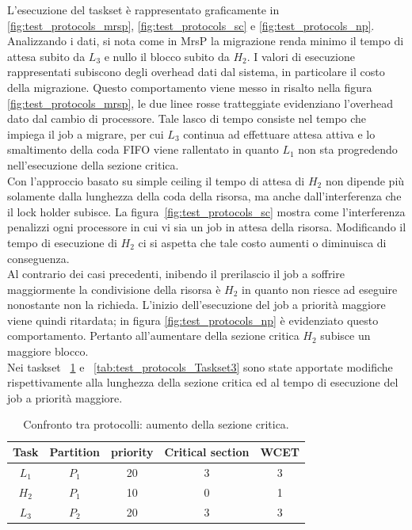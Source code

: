 \noindent L'esecuzione del taskset è rappresentato graficamente in \ref{fig:test_protocols_mrsp}, \ref{fig:test_protocols_sc} e \ref{fig:test_protocols_np}. Analizzando i dati, si nota come in MrsP la migrazione renda minimo il tempo di attesa subito da $L_3$ e nullo il blocco subito da $H_2$. I valori di esecuzione rappresentati subiscono degli overhead dati dal sistema, in particolare il costo della migrazione. Questo comportamento viene messo in risalto nella figura \ref{fig:test_protocols_mrsp}, le due linee rosse tratteggiate evidenziano l'overhead dato dal cambio di processore. Tale lasco di tempo consiste nel tempo che impiega il job a migrare, per cui $L_3$ continua ad effettuare attesa attiva e lo smaltimento della coda FIFO viene rallentato in quanto $L_1$ non sta progredendo nell'esecuzione della sezione critica.\\
Con l'approccio basato su simple ceiling il tempo di attesa di $H_2$ non dipende più solamente dalla lunghezza della coda della risorsa, ma anche dall'interferenza che il lock holder subisce. La figura~\ref{fig:test_protocols_sc} mostra come l'interferenza penalizzi ogni processore in cui vi sia un job in attesa della risorsa. Modificando il tempo di esecuzione di $H_2$ ci si aspetta che tale costo aumenti o diminuisca di conseguenza.\\
Al contrario dei casi precedenti, inibendo il prerilascio il job a soffrire maggiormente la condivisione della risorsa è $H_2$ in quanto non riesce ad eseguire nonostante non la richieda. L'inizio dell'esecuzione del job a priorità maggiore viene quindi ritardata; in figura \ref{fig:test_protocols_np} è evidenziato questo comportamento. Pertanto all'aumentare della sezione critica $H_2$ subisce un maggiore blocco.\\

\noindent Nei taskset ~\ref{tab:test_protocols_Taskset2} e ~\ref{tab:test_protocols_Taskset3} sono state apportate modifiche rispettivamente alla lunghezza della sezione critica ed al tempo di esecuzione del job a priorità maggiore.\\

\begin{table}
  \centering
  \begin{tabular}{ccccc}
  \hline\hline
    Task & Partition     & priority & Critical section & WCET  \\ \hline
    $L_1$ & $P_1$  & 20 & 3 & 3 \\
    $H_2$ & $P_1$  & 10 & 0 & 1 \\
    $L_3$ & $P_2$  & 20 & 3 & 3 \\
    \hline
    \end{tabular}
  \caption{Confronto tra protocolli: aumento della sezione critica.}
  \label{tab:test_protocols_Taskset2}
  \end{table}

